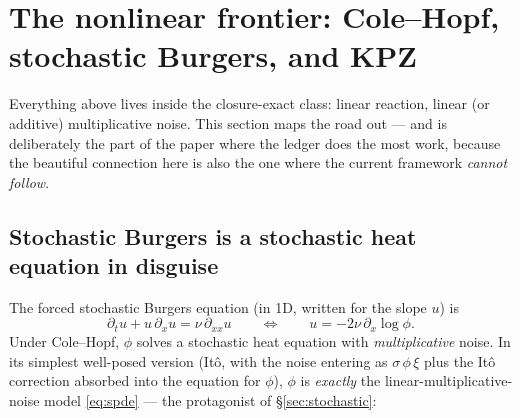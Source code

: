 \section{The nonlinear frontier: Cole--Hopf, stochastic Burgers, and KPZ}
\label{sec:weird}

Everything above lives inside the closure-exact class: linear reaction, linear
(or additive) multiplicative noise. This section maps the road out --- and is
deliberately the part of the paper where the ledger does the most work, because
the beautiful connection here is also the one where the current framework
\emph{cannot follow}.

\subsection{Stochastic Burgers is a stochastic heat equation in disguise}

The forced stochastic Burgers equation (in 1D, written for the slope $u$) is
\begin{equation}\label{eq:burgers}
\partial_t u + u\,\partial_x u = \nu\,\partial_{xx}u \qquad\Longleftrightarrow\qquad
u = -2\nu\,\partial_x\log\phi .
\end{equation}
Under Cole--Hopf, $\phi$ solves a stochastic heat equation with
\emph{multiplicative} noise. In its simplest well-posed version (It\^o, with the
noise entering as $\sigma\,\phi\,\xi$ plus the It\^o correction absorbed into
the equation for $\phi$), $\phi$ is \emph{exactly} the linear-multiplicative-
noise model \eqref{eq:spde} --- the protagonist of \S\ref{sec:stochastic}:

